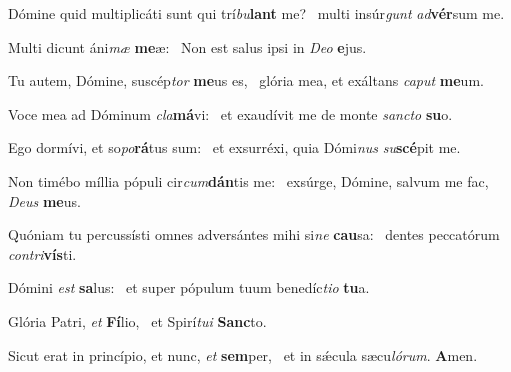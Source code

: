 \item Dómine quid multiplicáti sunt qui trí\textit{bu}\textbf{lant} me?~\psstar{} multi insúr\textit{gunt} \textit{ad}\textbf{vér}sum me.
\item Multi dicunt áni\textit{mæ} \textbf{me}æ:~\psstar{} Non est salus ipsi in \textit{De}\textit{o} \textbf{e}jus.
\item Tu autem, Dómine, suscép\textit{tor} \textbf{me}us es,~\psstar{} glória mea, et exáltans \textit{ca}\textit{put} \textbf{me}um.
\item Voce mea ad Dóminum \textit{cla}\textbf{má}vi:~\psstar{} et exaudívit me de monte \textit{sanc}\textit{to} \textbf{su}o.
\item Ego dormívi, et so\textit{po}\textbf{rá}tus sum:~\psstar{} et exsurréxi, quia Dómi\textit{nus} \textit{su}\textbf{scé}pit me.
\item Non timébo míllia pópuli cir\textit{cum}\textbf{dán}tis me:~\psstar{} exsúrge, Dómine, salvum me fac, \textit{De}\textit{us} \textbf{me}us.
\item Quóniam tu percussísti omnes adversántes mihi si\textit{ne} \textbf{cau}sa:~\psstar{} dentes peccatórum \textit{con}\textit{tri}\textbf{vís}ti.
\item Dómini \textit{est} \textbf{sa}lus:~\psstar{} et super pópulum tuum benedíc\textit{ti}\textit{o} \textbf{tu}a.
\item Glória Patri, \textit{et} \textbf{Fí}lio,~\psstar{} et Spirí\textit{tu}\textit{i} \textbf{Sanc}to.
\item Sicut erat in princípio, et nunc, \textit{et} \textbf{sem}per,~\psstar{} et in sǽcula sæcu\textit{ló}\textit{rum}. \textbf{A}men.
